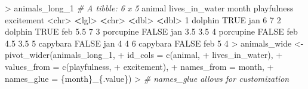\documentclass[
]{book}
\newenvironment{Shaded}{\begin{snugshade}}{\end{snugshade}}
\newcommand{\AttributeTok}[1]{\textcolor[rgb]{0.77,0.63,0.00}{#1}}
\newcommand{\CommentTok}[1]{\textcolor[rgb]{0.56,0.35,0.01}{\textit{#1}}}
\newcommand{\ConstantTok}[1]{\textcolor[rgb]{0.00,0.00,0.00}{#1}}
\newcommand{\DecValTok}[1]{\textcolor[rgb]{0.00,0.00,0.81}{#1}}
\newcommand{\ErrorTok}[1]{\textcolor[rgb]{0.64,0.00,0.00}{\textbf{#1}}}
\newcommand{\FloatTok}[1]{\textcolor[rgb]{0.00,0.00,0.81}{#1}}
\newcommand{\FunctionTok}[1]{\textcolor[rgb]{0.00,0.00,0.00}{#1}}
\newcommand{\NormalTok}[1]{#1}
\newcommand{\OtherTok}[1]{\textcolor[rgb]{0.56,0.35,0.01}{#1}}
\newcommand{\SpecialCharTok}[1]{\textcolor[rgb]{0.00,0.00,0.00}{#1}}
\newcommand{\StringTok}[1]{\textcolor[rgb]{0.31,0.60,0.02}{#1}}
\begin{document}
\begin{Shaded}
\begin{Highlighting}[]
\SpecialCharTok{\textgreater{}}\NormalTok{ animals\_long\_1}
\CommentTok{\# A tibble: 6 x 5}
\NormalTok{  animal    lives\_in\_water month playfulness excitement}
  \SpecialCharTok{\textless{}}\NormalTok{chr}\SpecialCharTok{\textgreater{}}     \ErrorTok{\textless{}}\NormalTok{lgl}\SpecialCharTok{\textgreater{}}          \ErrorTok{\textless{}}\NormalTok{chr}\SpecialCharTok{\textgreater{}}       \ErrorTok{\textless{}}\NormalTok{dbl}\SpecialCharTok{\textgreater{}}      \ErrorTok{\textless{}}\NormalTok{dbl}\SpecialCharTok{\textgreater{}}
\DecValTok{1}\NormalTok{ dolphin   }\ConstantTok{TRUE}\NormalTok{           jan           }\DecValTok{6}          \DecValTok{7}  
\DecValTok{2}\NormalTok{ dolphin   }\ConstantTok{TRUE}\NormalTok{           feb           }\FloatTok{5.5}        \DecValTok{7}  
\DecValTok{3}\NormalTok{ porcupine }\ConstantTok{FALSE}\NormalTok{          jan           }\FloatTok{3.5}        \FloatTok{3.5}
\DecValTok{4}\NormalTok{ porcupine }\ConstantTok{FALSE}\NormalTok{          feb           }\FloatTok{4.5}        \FloatTok{3.5}
\DecValTok{5}\NormalTok{ capybara  }\ConstantTok{FALSE}\NormalTok{          jan           }\DecValTok{4}          \DecValTok{4}  
\DecValTok{6}\NormalTok{ capybara  }\ConstantTok{FALSE}\NormalTok{          feb           }\DecValTok{5}          \DecValTok{4}  
\SpecialCharTok{\textgreater{}}\NormalTok{ animals\_wide }\OtherTok{\textless{}{-}} \FunctionTok{pivot\_wider}\NormalTok{(animals\_long\_1,}
\SpecialCharTok{+}                             \AttributeTok{id\_cols =} \FunctionTok{c}\NormalTok{(}\StringTok{\textquotesingle{}animal\textquotesingle{}}\NormalTok{, }
\SpecialCharTok{+}                                         \StringTok{\textquotesingle{}lives\_in\_water\textquotesingle{}}\NormalTok{),}
\SpecialCharTok{+}                             \AttributeTok{values\_from =} \FunctionTok{c}\NormalTok{(}\StringTok{\textquotesingle{}playfulness\textquotesingle{}}\NormalTok{,}
\SpecialCharTok{+}                                             \StringTok{\textquotesingle{}excitement\textquotesingle{}}\NormalTok{),}
\SpecialCharTok{+}                             \AttributeTok{names\_from =} \StringTok{\textquotesingle{}month\textquotesingle{}}\NormalTok{,}
\SpecialCharTok{+}                             \AttributeTok{names\_glue =} \StringTok{\textquotesingle{}\{month\}\_\{.value\}\textquotesingle{}}\NormalTok{) }
\SpecialCharTok{\textgreater{}}                             \CommentTok{\# \textasciigrave{}names\_glue\textasciigrave{} allows for customization }

\end{Highlighting}
\end{Shaded}
\end{document}
